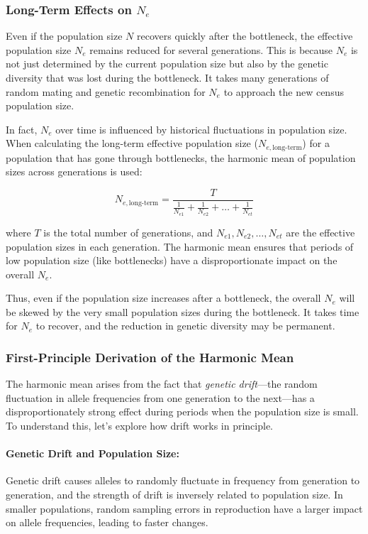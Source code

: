 \documentclass[10pt,a4paper]{scrbook}
\begin{document}
\subsubsection{Long-Term Effects on \(N_e\)}

Even if the population size \(N\) recovers quickly after the bottleneck, the effective population size \(N_e\) remains reduced for several generations. This is because \(N_e\) is not just determined by the current population size but also by the genetic diversity that was lost during the bottleneck. It takes many generations of random mating and genetic recombination for \(N_e\) to approach the new census population size.

In fact, \(N_e\) over time is influenced by historical fluctuations in population size. When calculating the long-term effective population size (\(N_{e,\text{long-term}}\)) for a population that has gone through bottlenecks, the harmonic mean of population sizes across generations is used:

\begin{equation}
N_{e,\text{long-term}} = \frac{T}{\frac{1}{N_{e1}} + \frac{1}{N_{e2}} + \dots + \frac{1}{N_{et}}}
\end{equation}

where \(T\) is the total number of generations, and \(N_{e1}, N_{e2}, \dots, N_{et}\) are the effective population sizes in each generation. The harmonic mean ensures that periods of low population size (like bottlenecks) have a disproportionate impact on the overall \(N_e\).

Thus, even if the population size increases after a bottleneck, the overall \(N_e\) will be skewed by the very small population sizes during the bottleneck. It takes time for \(N_e\) to recover, and the reduction in genetic diversity may be permanent.

\subsubsection{First-Principle Derivation of the Harmonic Mean}

The harmonic mean arises from the fact that \textit{genetic drift}—the random fluctuation in allele frequencies from one generation to the next—has a disproportionately strong effect during periods when the population size is small. To understand this, let’s explore how drift works in principle.

\paragraph{Genetic Drift and Population Size:}
Genetic drift causes alleles to randomly fluctuate in frequency from generation to generation, and the strength of drift is inversely related to population size. In smaller populations, random sampling errors in reproduction have a larger impact on allele frequencies, leading to faster changes.
\end{document}
